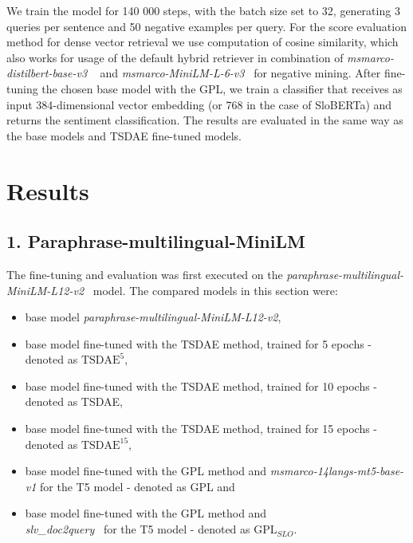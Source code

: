 \documentclass[fleqn,moreauthors,10pt]{ds_report}
\begin{document}
We train the model for 140 000 steps, with the batch size set to 32, generating 3 queries per sentence and 50 negative examples per query. For the score evaluation method for dense vector retrieval we use computation of cosine similarity, which also works for usage of the default hybrid retriever in combination of {\it msmarco-distilbert-base-v3 }~\cite{msmarcodistil} and {\it msmarco-MiniLM-L-6-v3}~\cite{msmarcominilm} for negative mining. After fine-tuning the chosen base model with the GPL, we train a classifier that receives as input 384-dimensional vector embedding (or 768 in the case of SloBERTa) and returns the sentiment classification. The results are evaluated in the same way as the base models and TSDAE fine-tuned models.





\section*{Results}


\subsection*{\large{1. Paraphrase-multilingual-MiniLM}}

The fine-tuning and evaluation was first executed on the {\it paraphrase-multilingual-MiniLM-L12-v2}~\cite{reimers-2019-sentence-bert} model. The compared models in this section were:
\begin{itemize}
	\item base model {\it paraphrase-multilingual-MiniLM-L12-v2},
	\item base model fine-tuned with the TSDAE method, trained for 5 epochs - denoted as $\text{TSDAE}^{5}$,
	\item base model fine-tuned with the TSDAE method, trained for 10 epochs - denoted as TSDAE,
	\item base model fine-tuned with the TSDAE method, trained for 15 epochs - denoted as $\text{TSDAE}^{15}$,
	\item base model fine-tuned with the GPL method and {\it msmarco-14langs-mt5-base-v1} \cite{msmarco14langs} for the T5 model - denoted as GPL and
	\item base model fine-tuned with the GPL method and \\{\it slv\_doc2query}~\cite{boshko} for the T5 model - denoted as $\text{GPL}_{SLO}$.
\end{itemize}
\end{document}
